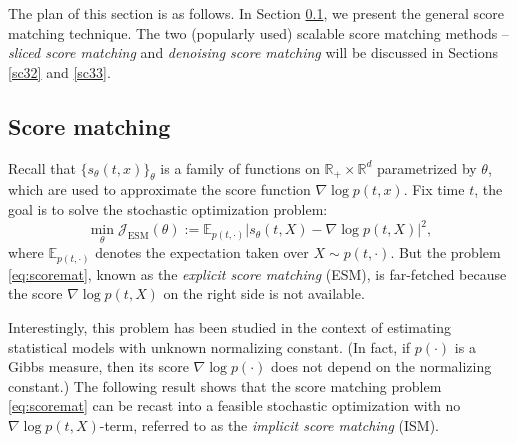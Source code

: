 \documentclass[letterpaper,11pt,reqno]{amsart}
\numberwithin{equation}{section}
\begin{document}
\quad The plan of this section is as follows.
In Section \ref{sc31},
we present the general score matching technique. 
The two (popularly used) scalable score matching methods --
{\em sliced score matching} and {\em denoising score matching}
will be discussed in 
Sections \ref{sc32} and \ref{sc33}.

\subsection{Score matching}
\label{sc31}

Recall that $\{s_\theta(t,x)\}_\theta$ is a family of functions on $\mathbb{R}_+ \times \mathbb{R}^d$
parametrized by $\theta$,
which are used to approximate the score function $\nabla \log p(t,x)$.
Fix time $t$, 
the goal is to solve the stochastic optimization problem:
\begin{equation}
\label{eq:scoremat}
\min_\theta \mathcal{J}_{\text{ESM}}(\theta):=\mathbb{E}_{p(t, \cdot)} |s_\theta(t,X) - \nabla \log p(t,X)|^2,
\end{equation}
where $\mathbb{E}_{p(t, \cdot)}$ denotes the expectation taken over $X \sim p(t, \cdot)$.
But
the problem \eqref{eq:scoremat}, 
known as the {\em explicit score matching} (ESM),
is far-fetched 
because the score $\nabla \log p (t,X)$ on the right side is not available.

\quad Interestingly, this problem has been studied in the context of estimating statistical models with unknown normalizing constant.
(In fact, if $p(\cdot)$ is a Gibbs measure, then its score $\nabla \log p(\cdot)$ does not depend on the normalizing constant.)
The following result 
shows that the score matching problem \eqref{eq:scoremat}
can be recast into 
a feasible stochastic optimization with no $\nabla \log p(t, X)$-term,
referred to as the {\em implicit score matching} (ISM).
\end{document}
